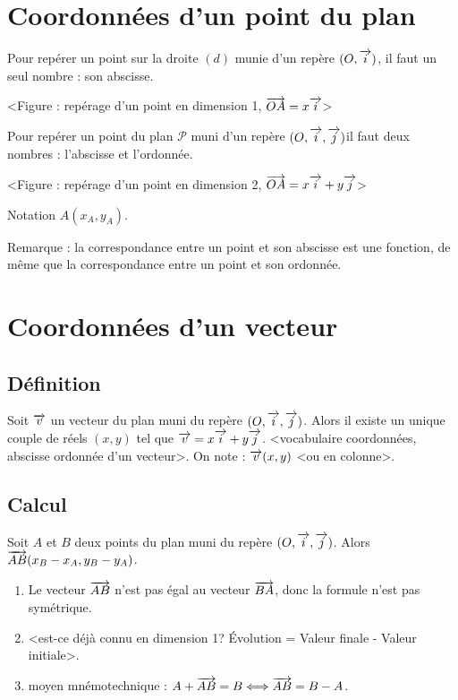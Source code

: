 \documentclass[a4paper,11pt,DIV18,BCOR0mm]{scrartcl}
\begin{document}
\section{Coordonnées d'un point du plan}
Pour repérer un point sur la droite $(d)$ munie d'un repère $(O,\overrightarrow{i})$, il faut un seul nombre : son abscisse.
\begin{center}
 <Figure : repérage d'un point en dimension 1, $\overrightarrow{OA}=x\overrightarrow{i}$>
\end{center}
Pour repérer un point du plan $\mathcal{P}$ muni d'un repère  $(O,\overrightarrow{i},\overrightarrow{j})$il faut deux nombres : l'abscisse et l'ordonnée.
\begin{center}
 <Figure : repérage d'un point en dimension 2, $\overrightarrow{OA}=x\overrightarrow{i}+y\overrightarrow{j}$>

Notation $A(x_A,y_A)$.

Remarque : la correspondance entre un point et son abscisse est une fonction, de même que la correspondance
entre un point et son ordonnée.
\end{center}

\section{Coordonnées d'un vecteur}
\subsection{Définition}
\begin{definition}
 Soit $\overrightarrow{v}$ un vecteur du plan muni du repère $(O,\overrightarrow{i},\overrightarrow{j})$. Alors il existe un unique couple
de réels $(x,y)$ tel que $\overrightarrow{v}=x\overrightarrow{i}+y\overrightarrow{j}$. <vocabulaire coordonnées, abscisse ordonnée d'un vecteur>.
On note : $\overrightarrow{v}(x,y)$ <ou en colonne>. 
\end{definition}

\subsection{Calcul}
\begin{theoreme}
 Soit $A$ et $B$ deux points du plan muni du repère $(O,\overrightarrow{i},\overrightarrow{j})$. Alors $\overrightarrow{AB}(x_B-x_A, y_B-y_A)$.
\end{theoreme}
\begin{remarque}
\begin{enumerate}
 \item Le vecteur $\overrightarrow{AB}$ n'est pas égal au vecteur $\overrightarrow{BA}$, donc la formule n'est pas symétrique.
 \item <est-ce déjà connu en dimension 1? Évolution = Valeur finale - Valeur initiale>. 
 \item moyen mnémotechnique : $A+\overrightarrow{AB}=B\Longleftrightarrow\overrightarrow{AB}=B-A$.
\end{enumerate}
\end{remarque}
\end{document}
